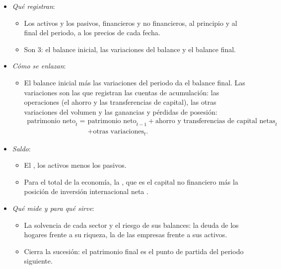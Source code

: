 \documentclass[11pt]{article}
\begin{document}
\begin{itemize}
\item \emph{Qué registran}:
  \begin{itemize}
  \item Los activos y los pasivos, financieros y no financieros, al principio y al final del periodo, a los precios de cada fecha.
  \item Son 3: el balance inicial, las variaciones del balance y el balance final.
  \end{itemize}
\item \emph{Cómo se enlazan}:
  \begin{itemize}
  \item El balance inicial más las variaciones del periodo da el balance final. Las variaciones son las que registran las cuentas de acumulación: las operaciones (el ahorro y las transferencias de capital), las otras variaciones del volumen y las ganancias y pérdidas de posesión:
\begin{equation}\label{eq:balance}
\begin{aligned}\text{patrimonio neto}_t={}&\text{patrimonio neto}_{t-1}+\text{ahorro y transferencias de capital netas}_t\\&+\text{otras variaciones}_t .\end{aligned}
\end{equation}
  \end{itemize}
\item \emph{Saldo}:
  \begin{itemize}
  \item El , los activos menos los pasivos.
  \item Para el total de la economía, la , que es el capital no financiero más la posición de inversión internacional neta .
  \end{itemize}
\item \emph{Qué mide y para qué sirve}:
  \begin{itemize}
  \item La solvencia de cada sector y el riesgo de sus balances: la deuda de los hogares frente a su riqueza, la de las empresas frente a sus activos.
  \item Cierra la sucesión: el patrimonio final es el punto de partida del periodo siguiente.
  \end{itemize}
\end{itemize}

\end{document}
